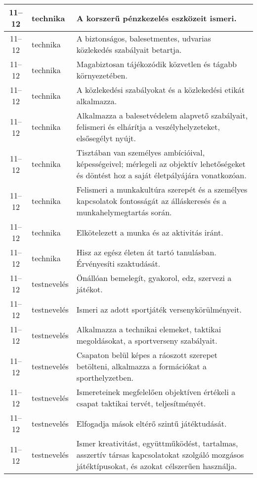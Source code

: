 \begin{small}
\begin{longtable}{c | p{2cm} |  p{11cm} }
              11--12 & technika & A korszerű pénzkezelés eszközeit ismeri. \\ \hline
              11--12 & technika & A biztonságos, balesetmentes, udvarias közlekedés szabályait betartja. \\ \hline
              11--12 & technika & Magabiztosan tájékozódik közvetlen és tágabb környezetében. \\ \hline
              11--12 & technika & A közlekedési szabályokat és a közlekedési etikát alkalmazza. \\ \hline
              11--12 & technika & Alkalmazza a balesetvédelem alapvető szabályait, felismeri és elhárítja a veszélyhelyzeteket, elsősegélyt nyújt. \\ \hline
              11--12 & technika & Tisztában van személyes ambícióival, képességeivel; mérlegeli az objektív lehetőségeket és döntést hoz a saját életpályájára vonatkozóan. \\ \hline
              11--12 & technika & Felismeri a munkakultúra szerepét és a személyes kapcsolatok fontosságát az álláskeresés és a munkahelymegtartás során. \\ \hline
              11--12 & technika & Elkötelezett a munka és az aktivitás iránt. \\ \hline
              11--12 & technika & Hisz az egész életen át tartó tanulásban. Érvényesíti szaktudását. \\ \hline
              11--12 & testnevelés & Önállóan bemelegít, gyakorol, edz, szervezi a játékot. \\ \hline
              11--12 & testnevelés & Ismeri az adott sportjáték versenykörülményeit. \\ \hline
              11--12 & testnevelés & Alkalmazza a technikai elemeket, taktikai megoldásokat, a sportverseny szabályait. \\ \hline
              11--12 & testnevelés & Csapaton belül képes a ráoszott szerepet betölteni, alkalmazza a formációkat a sporthelyzetben. \\ \hline
              11--12 & testnevelés & Ismereteinek megfelelően objektíven értékeli a csapat taktikai tervét, teljesítményét. \\ \hline
              11--12 & testnevelés & Elfogadja mások eltérő szintű játéktudását. \\ \hline
              11--12 & testnevelés & Ismer kreativitást, együttműködést, tartalmas, asszertív társas kapcsolatokat szolgáló mozgásos játéktípusokat, és azokat célszerűen használja. \\ \hline

\end{longtable}
\end{small}
